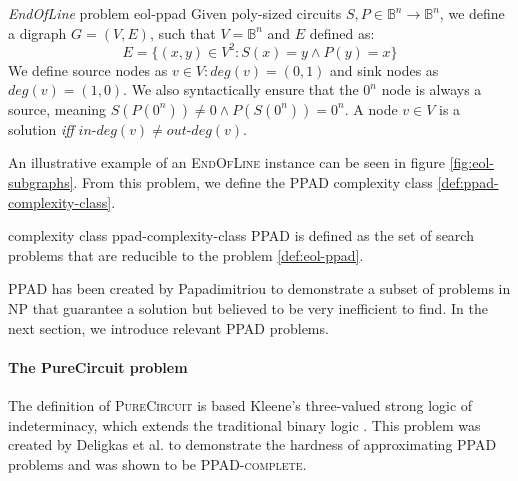 \begin{definitionbox}{\textit{EndOfLine} problem \cite{papadimitriou_ComplexityParityArgument_1994}}{eol-ppad}
    Given poly-sized circuits $S, P \in \mathbb{B}^n \to \mathbb{B}^n$,
    we define a digraph $G = (V,E)$, such that $V= \mathbb{B}^n$ and $E$ defined as:
    $$
        E = \{(x,y) \in V^2: S(x) = y \wedge P(y) = x\}
    $$
    We define source nodes as $v \in V: \textit{deg}(v) = (0,1)$  and sink nodes as
    $\textit{deg}(v) = (1,0)$.
    We also syntactically ensure that the $0^n$ node is always a source, meaning
    $S(P(0^n)) \neq 0 \wedge P(S(0^n)) = 0^n$.
    A node $v \in V$ is a solution \textit{iff} $\textit{in-deg}(v) \neq \textit{out-deg}(v)$.
\end{definitionbox}


\vspace{0.2cm}

An illustrative example of an \textsc{EndOfLine} instance can be seen in figure \ref{fig:eol-subgraphs}.
From this problem, we define the \textsc{PPAD} complexity class \ref{def:ppad-complexity-class}.

\begin{definitionbox}{ complexity class \cite{papadimitriou_ComplexityParityArgument_1994}}{ppad-complexity-class}
    \textsc{PPAD} is defined as the set of search problems that
    are reducible to the  problem \ref{def:eol-ppad}.
\end{definitionbox}

\textsc{PPAD} has been created by Papadimitriou \cite{papadimitriou_ComplexityParityArgument_1994}
to demonstrate a subset of problems in \textsc{NP} that guarantee
a solution but believed to be very inefficient to find.
In the next section,
we introduce relevant \textsc{PPAD} problems.

\paragraph{The PureCircuit problem}
\label{par:pure-circ-def}

The definition of \textsc{PureCircuit} is based Kleene's three-valued strong logic of indeterminacy,
which extends the traditional binary logic \cite{kleene_IntroductionMetamathematics_2009}.
This problem was created by Deligkas et al. \cite{deligkas_PureCircuitTightInapproximability_2024}
to demonstrate the hardness of approximating \textsc{PPAD} problems and was shown to be \textsc{PPAD-complete}.


